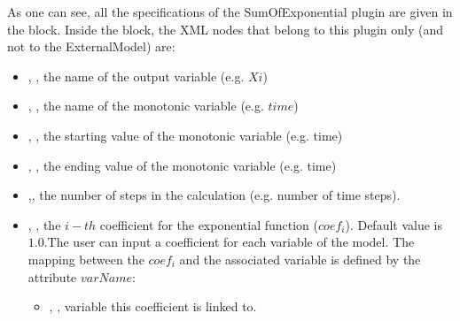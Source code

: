 As one can see, all the specifications of the SumOfExponential plugin are given in the 
 block. Inside the  block,  the XML
nodes that belong to this plugin only (and not to the ExternalModel) are:
\begin{itemize}
  \item  {}, , the name of the output variable (e.g. $Xi$)
  \item  {}, ,  the name of the monotonic variable (e.g. $time$)
  \item  {}, , the starting value of the monotonic variable (e.g. time)
  \item  {}, , the ending value of the monotonic variable (e.g. time)
  \item  {},, the number of steps in the calculation (e.g. number of time 
  steps).
  \item  {}, , the $i-th$ coefficient for the exponential function ($coef_i$).
  Default value is $1.0$.The user can input a coefficient for each variable  of the model. 
  The mapping between the $coef_i$ and the associated variable is defined by the 
  attribute $varName$:
  \begin{itemize}
    \item {}, , variable this coefficient
    is linked to.
  \end{itemize}
\end{itemize}

